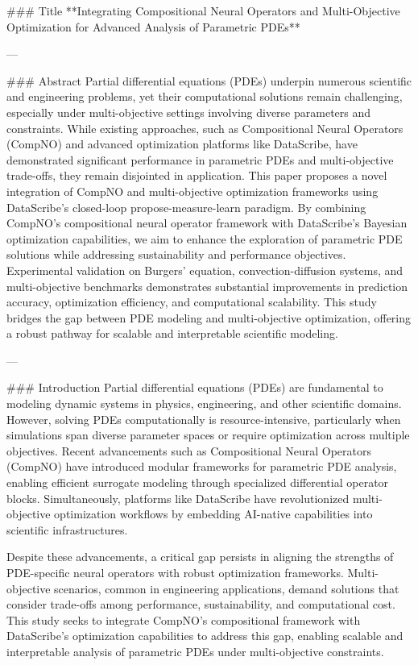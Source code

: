 ### Title  
**Integrating Compositional Neural Operators and Multi-Objective Optimization for Advanced Analysis of Parametric PDEs**

---

### Abstract  
Partial differential equations (PDEs) underpin numerous scientific and engineering problems, yet their computational solutions remain challenging, especially under multi-objective settings involving diverse parameters and constraints. While existing approaches, such as Compositional Neural Operators (CompNO) and advanced optimization platforms like DataScribe, have demonstrated significant performance in parametric PDEs and multi-objective trade-offs, they remain disjointed in application. This paper proposes a novel integration of CompNO and multi-objective optimization frameworks using DataScribe's closed-loop propose-measure-learn paradigm. By combining CompNO's compositional neural operator framework with DataScribe's Bayesian optimization capabilities, we aim to enhance the exploration of parametric PDE solutions while addressing sustainability and performance objectives. Experimental validation on Burgers' equation, convection-diffusion systems, and multi-objective benchmarks demonstrates substantial improvements in prediction accuracy, optimization efficiency, and computational scalability. This study bridges the gap between PDE modeling and multi-objective optimization, offering a robust pathway for scalable and interpretable scientific modeling.

---

### Introduction  
Partial differential equations (PDEs) are fundamental to modeling dynamic systems in physics, engineering, and other scientific domains. However, solving PDEs computationally is resource-intensive, particularly when simulations span diverse parameter spaces or require optimization across multiple objectives. Recent advancements such as Compositional Neural Operators (CompNO) have introduced modular frameworks for parametric PDE analysis, enabling efficient surrogate modeling through specialized differential operator blocks. Simultaneously, platforms like DataScribe have revolutionized multi-objective optimization workflows by embedding AI-native capabilities into scientific infrastructures.

Despite these advancements, a critical gap persists in aligning the strengths of PDE-specific neural operators with robust optimization frameworks. Multi-objective scenarios, common in engineering applications, demand solutions that consider trade-offs among performance, sustainability, and computational cost. This study seeks to integrate CompNO's compositional framework with DataScribe's optimization capabilities to address this gap, enabling scalable and interpretable analysis of parametric PDEs under multi-objective constraints.

